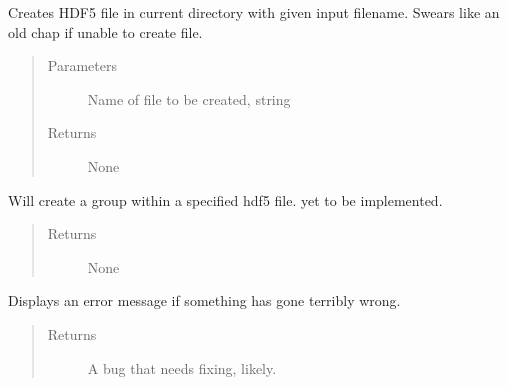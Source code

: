 \documentclass[letterpaper,10pt,english]{sphinxmanual}
\begin{document}
\begin{fulllineitems}
\begin{fulllineitems}
\label{\detokenize{index:HDF5Browser.FileBrowser.__createFile}}
\sphinxAtStartPar
Creates HDF5 file in current directory with given input filename.
Swears like an old chap if unable to create file.
\begin{quote}\begin{description}
\item[{Parameters}] \leavevmode
\sphinxAtStartPar
{} \textendash{} Name of file to be created, string

\item[{Returns}] \leavevmode
\sphinxAtStartPar
None

\end{description}\end{quote}

\end{fulllineitems}


\begin{fulllineitems}
\label{\detokenize{index:HDF5Browser.FileBrowser.__createGroup}}
\sphinxAtStartPar
Will create a group within a specified hdf5 file. yet to be implemented.
\begin{quote}\begin{description}
\item[{Returns}] \leavevmode
\sphinxAtStartPar
None

\end{description}\end{quote}

\end{fulllineitems}


\begin{fulllineitems}
\label{\detokenize{index:HDF5Browser.FileBrowser.__errmessage}}
\sphinxAtStartPar
Displays an error message if something has gone terribly wrong.
\begin{quote}\begin{description}
\item[{Returns}] \leavevmode
\sphinxAtStartPar
A bug that needs fixing, likely.


\end{description}
\end{quote}
\end{fulllineitems}
\end{fulllineitems}
\end{document}
